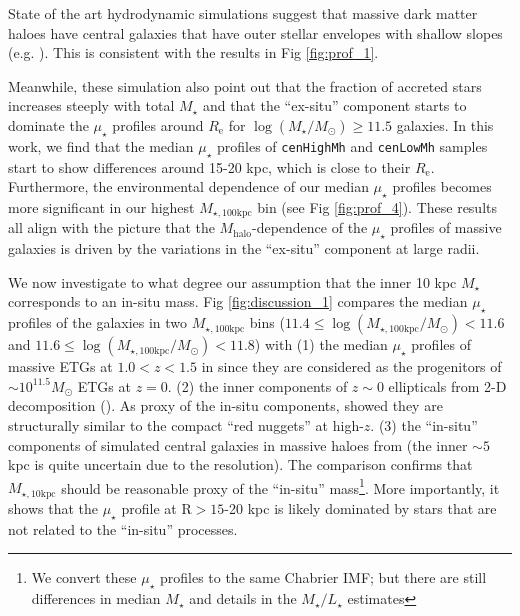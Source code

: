 \documentclass[a4paper,fleqn,usenatbib]{mnras}
\def\rbcg{\texttt{cenHighMh}}
\def\nbcg{\texttt{cenLowMh}}
\def\mstar{{$M_{\star}$}}
\def\mhalo{{$M_{\mathrm{halo}}$}}
\def\logms{{$\log (M_{\star}/M_{\odot})$}}
\def\minn{{$M_{\star,10\mathrm{kpc}}$}}
\def\mtot{{$M_{\star,100\mathrm{kpc}}$}}
\def\logmtot{{$\log (M_{\star,100\mathrm{kpc}}/M_{\odot})$}}
\def\m2l{{$M_{\star}/L_{\star}$}}
\def\mden{{$\mu_{\star}$}}
\begin{document}
    State of the art hydrodynamic simulations suggest that massive dark matter haloes 
    have central galaxies that have outer stellar envelopes with shallow slopes 
    (e.g. \citealt{Pillepich2014}). 
    This is consistent with the results in Fig \ref{fig:prof_1}.
     
    Meanwhile, these simulation also point out that the fraction of accreted stars 
    increases steeply with total \mstar{} and that the ``ex-situ'' component
    starts to dominate the \mden{} profiles around $R_{\mathrm{e}}$ for 
    \logms{}$\geq 11.5$ galaxies. 
    In this work, we find that the median \mden{} profiles of \rbcg{} and \nbcg{} 
    samples start to show differences around 15-20 kpc, which is close to 
    their $R_{\mathrm{e}}$. 
    Furthermore, the environmental dependence of our median \mden{} profiles 
    becomes more significant in our highest \mtot{} bin (see Fig \ref{fig:prof_4}). 
    These results all align with the picture that the \mhalo{}-dependence of the 
    \mden{} profiles of massive galaxies is driven by the variations in the 
    ``ex-situ'' component at large radii. 
   
    We now investigate to what degree our assumption that the inner 10 kpc \mstar{}
    corresponds to an in-situ mass.    
    Fig \ref{fig:discussion_1} compares the median \mden{} profiles of the 
    galaxies in two \mtot{} bins 
    ($11.4\leq$\logmtot{}$<11.6$ and $11.6\leq$\logmtot{}$<11.8$) with 
    (1) the median \mden{} profiles of massive ETGs at $1.0 < z < 1.5$ in
    \citealt{Patel2013} since they are considered as the progenitors of 
    ${\sim} 10^{11.5} M_{\odot}$ ETGs at $z=0$.    
    (2) the inner components of $z{\sim} 0$ ellipticals from 2-D decomposition 
    (\citealt{Huang2013a}).
    As proxy of the in-situ components, \citet{Huang2013b} showed they are 
    structurally similar to the compact ``red nuggets'' at high-$z$. 
    (3) the ``in-situ'' components of simulated central galaxies in massive haloes 
    from \citet{Cooper13} (the inner ${\sim} 5$ kpc is quite uncertain due to the 
    resolution).  
    The comparison confirms that \minn{} should be reasonable proxy of the 
    ``in-situ'' mass\footnote{We convert these \mden{} profiles to the same 
    Chabrier IMF; but there are still differences in median \mstar{} and 
    details in the \m2l{} estimates}.  
    More importantly, it shows that the \mden{} profile at 
    $\mathrm{R} > 15$-20 kpc is likely dominated by stars that are not related 
    to the ``in-situ'' processes.  
    
\end{document}
